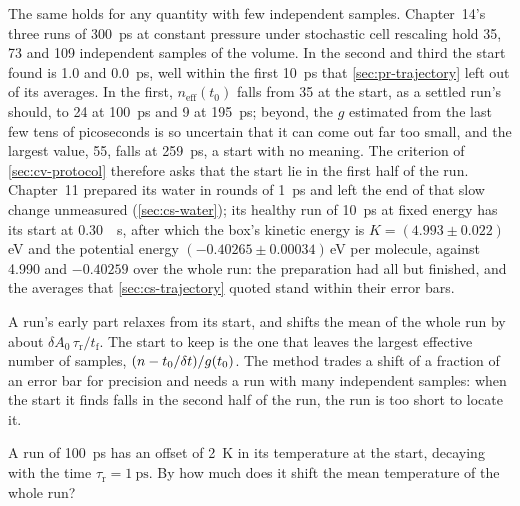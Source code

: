 The same holds for any quantity with few independent samples.
Chapter~14's three runs of \SI{300}{\pico\second} at constant pressure
under stochastic cell rescaling hold 35, 73 and 109 independent samples of
the volume. In the second and third the start found is 1.0 and
\SI{0.0}{\pico\second}, well within the first \SI{10}{\pico\second} that
\cref{sec:pr-trajectory} left out of its averages. In the first,
$n_{\mathrm{eff}}(t_0)$ falls from 35 at the start, as a settled run's
should, to 24 at \SI{100}{\pico\second} and 9 at \SI{195}{\pico\second};
beyond, the $g$ estimated from the last few tens of picoseconds is so
uncertain that it can come out far too small, and the largest value, 55,
falls at \SI{259}{\pico\second}, a start with no meaning. The criterion of \cref{sec:cv-protocol}
therefore asks that the start lie in the first half of the run. Chapter~11
prepared its water in rounds of \SI{1}{\pico\second} and left the end of
that slow change unmeasured (\cref{sec:cs-water}); its healthy run of
\SI{10}{\pico\second} at fixed energy has its start at \SI{0.30}{\pico
\second}, after which the box's kinetic energy is $K = (4.993 \pm
0.022)$\,\si{\electronvolt} and the potential energy $(-0.40265 \pm
0.00034)$\,\si{\electronvolt} per molecule, against 4.990 and $-0.40259$
over the whole run: the preparation had all but finished, and
the averages that \cref{sec:cs-trajectory} quoted stand within their error
bars.

\begin{keyidea}
A run's early part relaxes from its start, and shifts the mean of the
whole run by about $\delta A_0\,\tau_{\mathrm r}/t_{\mathrm f}$. The start to keep is the
one that leaves the largest effective number of samples, $(n - t_0/\delta t)/
g(t_0)$. The method trades a shift of a fraction of an error bar for
precision and needs a
run with many independent samples: when the start it finds falls in the
second half of the run, the run is too short to locate it.
\end{keyidea}


\begin{selfcheck}
A run of \SI{100}{\pico\second} has an offset of \SI{2}{\kelvin} in its
temperature at the start, decaying with the time $\tau_{\mathrm r} =
\SI{1}{\pico\second}$. By how much
does it shift the mean temperature of the whole run?
\end{selfcheck}
